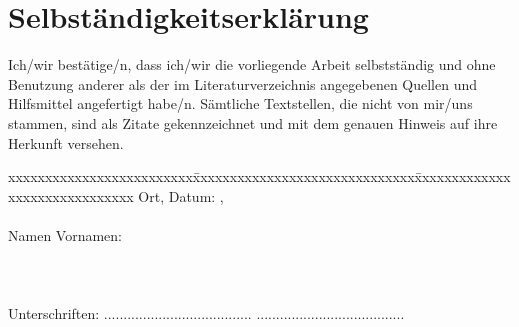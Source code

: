 \chapter*{Selbständigkeitserklärung}
\label{chap:selbstaendigkeitserklaerung}

\vspace*{10mm} 

Ich/wir bestätige/n, dass ich/wir die vorliegende Arbeit selbstständig und ohne Benutzung anderer als der im Literaturverzeichnis angegebenen Quellen und Hilfsmittel angefertigt habe/n. Sämtliche Textstellen, die nicht von mir/uns stammen, sind als Zitate gekennzeichnet und mit dem genauen Hinweis auf ihre Herkunft versehen. 

\vspace{15mm}

\begin{tabbing}
xxxxxxxxxxxxxxxxxxxxxxxxx\=xxxxxxxxxxxxxxxxxxxxxxxxxxxxxx\=xxxxxxxxxxxxxxxxxxxxxxxxxxxxxx\kill
Ort, Datum:		, \versiondate \\ \\ 
Namen Vornamen:	 	 \\ \\ \\ \\ 
Unterschriften:	\> ......................................\> ...................................... \\
\end{tabbing}